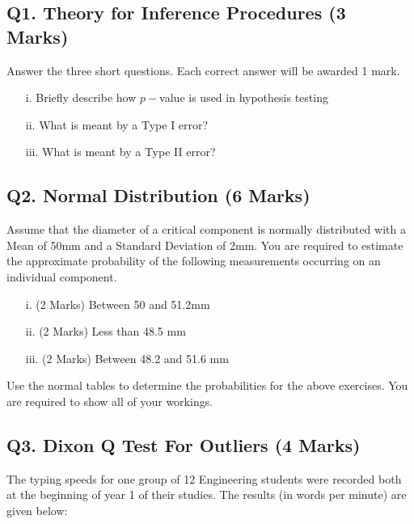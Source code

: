 \documentclass[a4paper,12pt]{article}
\begin{document}
\subsection*{Q1. Theory for Inference Procedures (3 Marks)}
Answer the three short questions. Each correct answer will be awarded 1 mark.
\begin{itemize}
\item[i.] Briefly describe how $p-$value is used in hypothesis testing
\item[ii.] What is meant by a Type I error?
\item[iii.] What is meant by a Type II error?
\end{itemize}
%

\subsection*{Q2. Normal Distribution (6 Marks)} %
Assume that the diameter of a critical component is normally distributed with a Mean of 50mm and a Standard Deviation of 2mm. You are required  to estimate the approximate probability of the following measurements occurring on an individual component.
\begin{itemize}
	\item [i.](2 Marks)	Between 50 and 51.2mm
	\item [ii.](2 Marks) Less than 48.5 mm
	\item [iii.](2 Marks) Between 48.2 and 51.6 mm
\end{itemize}

\noindent Use the normal tables to determine the probabilities for the above exercises. You are required to show all of your workings.

\subsection*{Q3. Dixon Q Test For Outliers (4 Marks)}

The typing speeds for one group of 12 Engineering students were recorded both at the beginning of year 1 of their studies. The results (in words per minute) are given below:
\end{document}
